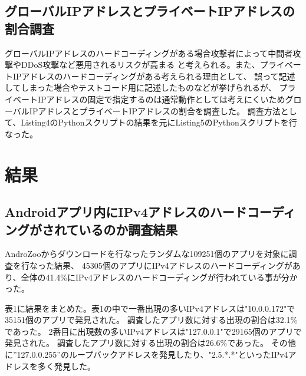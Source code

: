 \documentclass[a4j]{jarticle}
\begin{document}
\subsection{グローバルIPアドレスとプライベートIPアドレスの割合調査}
グローバルIPアドレスのハードコーディングがある場合攻撃者によって中間者攻撃やDDoS攻撃など悪用されるリスクが高まる
と考えられる。また、プライベートIPアドレスのハードコーディングがある考えられる理由として、
誤って記述してしまった場合やテストコード用に記述したものなどが挙げられるが、
プライベートIPアドレスの固定で指定するのは通常動作としては考えにくいためグローバルIPアドレスとプライベートIPアドレスの割合を調査した。
調査方法として、Listing4のPythonスクリプトの結果を元にListing5のPythonスクリプトを行なった。
\newpage
\section{結果}
\subsection{Androidアプリ内にIPv4アドレスのハードコーディングがされているのか調査結果}
AndroZooからダウンロードを行なったランダムな109251個のアプリを対象に調査を行なった結果、
45305個のアプリにIPv4アドレスのハードコーディングがあり、全体の41.4\%にIPv4アドレスのハードコーディングが行われている事が分かった。

表1に結果をまとめた。表1の中で一番出現の多いIPv4アドレスは"10.0.0.172"で35151個のアプリで発見された。
調査したアプリ数に対する出現の割合は32.1\%であった。
2番目に出現数の多いIPv4アドレスは"127.0.0.1"で29165個のアプリで発見された。
調査したアプリ数に対する出現の割合は26.6\%であった。
その他に”127.0.0.255”のループバックアドレスを発見したり、"2.5.*.*"といったIPv4アドレスを多く発見した。
\end{document}
